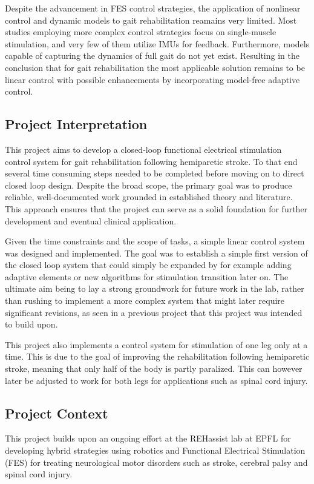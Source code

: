 Despite the advancement in FES control strategies, the application of nonlinear control and dynamic models to gait rehabilitation reamains very limited. Most studies employing more complex control strategies focus on single-muscle stimulation, and very few of them utilize IMUs for feedback. Furthermore, models capable of capturing the dynamics of full gait do not yet exist. Resulting in the conclusion that for gait rehabilitation the most applicable solution remains to be linear control with possible enhancements by incorporating model-free adaptive control.

\subsection{Project Interpretation}
This project aims to develop a closed-loop functional electrical stimulation control system for gait rehabilitation following hemiparetic stroke. To that end several time consuming steps needed to be completed before moving on to direct closed loop design. Despite the broad scope, the primary goal was to produce reliable, well-documented work grounded in established theory and literature. This approach ensures that the project can serve as a solid foundation for further development and eventual clinical application.

Given the time constraints and the scope of tasks, a simple linear control system was designed and implemented. The goal was to establish a simple first version of the closed loop system that could simply be expanded by for example adding adaptive elements or new algorithms for stimulation transition later on. The ultimate aim being to lay a strong groundwork for future work in the lab, rather than rushing to implement a more complex system that might later require significant revisions, as seen in a previous project that this project was intended to build upon.

This project also implements a control system for stimulation of one leg only at a time. This is due to the goal of improving the rehabilitation following hemiparetic stroke, meaning that only half of the body is partly paralized. This can however later be adjusted to work for both legs for applications such as spinal cord injury.



\subsection{Project Context}
This project builds upon an ongoing effort at the REHassist lab at EPFL for developing hybrid strategies using robotics and Functional Electrical Stimulation (FES) for treating neurological motor disorders such as stroke, cerebral palsy and spinal cord injury. 

